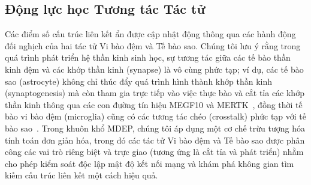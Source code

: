 \documentclass[11pt]{article}
\begin{document}
\subsection{Động lực học Tương tác Tác tử}\label{subsec:agents}

Các điểm số cấu trúc liên kết ẩn được cập nhật động thông qua các hành động đối nghịch của hai tác tử Vi bào đệm và Tế bào sao. Chúng tôi lưu ý rằng trong quá trình phát triển hệ thần kinh sinh học, sự tương tác giữa các tế bào thần kinh đệm và các khớp thần kinh (synapse) là vô cùng phức tạp; ví dụ, các tế bào sao (astrocyte) không chỉ thúc đẩy quá trình hình thành khớp thần kinh (synaptogenesis) mà còn tham gia trực tiếp vào việc thực bào và cắt tỉa các khớp thần kinh thông qua các con đường tín hiệu MEGF10 và MERTK~\cite{chung2013astrocytes}, đồng thời tế bào vi bào đệm (microglia) cũng có các tương tác chéo (crosstalk) phức tạp với tế bào sao~\cite{vainchtein2018astrocyte}. Trong khuôn khổ MDEP, chúng tôi áp dụng một cơ chế trừu tượng hóa tính toán đơn giản hóa, trong đó các tác tử Vi bào đệm và Tế bào sao được phân công các vai trò riêng biệt và trực giao (tương ứng là cắt tỉa và phát triển) nhằm cho phép kiểm soát độc lập mật độ kết nối mạng và khám phá không gian tìm kiếm cấu trúc liên kết một cách hiệu quả.
\end{document}
